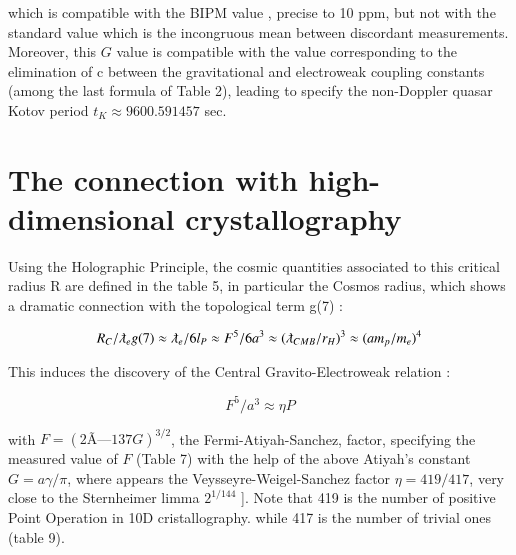 \documentclass[a4paper,9pt]{article}
\begin{document}
which is compatible with the BIPM value \cite{Quinn}, precise to 10 ppm, but not with the standard value \cite{Tannabashi} which is the incongruous mean between discordant measurements. Moreover, this $G$ value is compatible with the value corresponding to the elimination of c between the gravitational and electroweak coupling constants (among the last formula of Table 2), leading to specify the non-Doppler quasar Kotov period $t_K \approx 9600.591457$ sec.

\section{The connection with high-dimensional crystallography}

Using the Holographic Principle, the cosmic quantities associated to this critical radius R are defined in the table 5, in particular the Cosmos radius, which shows a dramatic connection with the topological term g(7) :

\begin{equation}
  R_{C}/\lambdabar_{e} g(7) \approx  \lambdabar_{e}/6l_P \approx F^5/6a^3 \approx (\lambdabar_{CMB}/r_H)^3 \approx  (am_p/m_e)^4
  
\end{equation}

This induces the discovery of the Central Gravito-Electroweak relation :

\begin{equation*}
F^5/a^3 \approx \eta P    
\end{equation*}{}
  

with  $F = (2 Ã— 137 G)^{3/2}$, the Fermi-Atiyah-Sanchez, factor, specifying the measured value of  $F$ (Table 7) with the help of the above Atiyah's constant $G = a \gamma/ \pi$, where appears the Veysseyre-Weigel-Sanchez factor $\eta = 419/417$, very close to the Sternheimer limma $2^{1/144}$ \cite{Sternheimer}]. Note that 419 is the number of positive Point Operation in 10D cristallography. while 417 is the number of trivial ones \cite{Weigel} (table 9).
\end{document}
